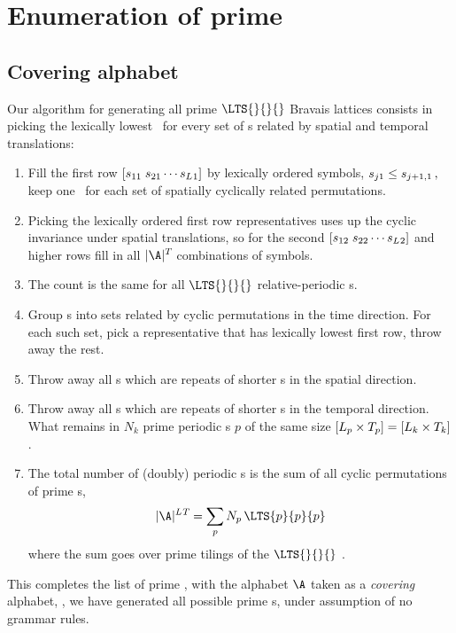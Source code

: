 
\section{Enumeration of prime \twots}
\label{sect:Count2dprimePO}

\begin{description}


\end{description}


\subsection{Covering alphabet}
\label{sect:prime2tCover}

Our algorithm for generating all prime $\LTS{}{}{}$ Bravais
lattices consists in picking the lexically lowest \brick\
for every set of \brick s related by spatial and temporal translations:
\begin{enumerate}
  \item
Fill the first row
\(
\left[{s_{11}}\;{s_{21}}\cdots{\ensuremath{s_{{L_{}}1}}}\right]
\)
by lexically ordered symbols,
\(
{s_{j1}}\leq{\ensuremath{s_{j+1,1}}}\,,
\)
keep one \brick\ for each set of spatially cyclically related
permutations.
  \item
Picking the lexically ordered first row representatives uses up the
cyclic invariance under spatial translations, so for the second
\(
\left[{s_{12}}\;{s_{22}}\cdots{\ensuremath{s_{{L_{}}2}}}\right]
\)
and higher rows fill in all $|\A|^\period{}$ combinations of  symbols.
  \item
The count is the same for all $\LTS{}{}{}$
relative-periodic {\brick}s.
  \item
Group \brick s into sets related by cyclic permutations in the time
direction. For each such set, pick a representative that has lexically
lowest first row, throw away the rest.
  \item
Throw away all {\brick}s which are repeats of
shorter {\brick}s in the spatial direction.
  \item
Throw away all {\brick}s which are repeats of
shorter {\brick}s in the temporal direction. What
remains in $N_k$ prime periodic \brick s $p$ of the same size
$[{L_{p}}\times{\ensuremath{T_{p}}}]=[{L_{k}}\times{\ensuremath{T_{k}}}]$.
  \item
The total number
of (doubly) periodic
\brick s is the sum of all cyclic permutations of prime \brick s,
\[
|\A|^{\speriod{}\period{}}
=
\sum_p N_{p}\,\LTS{p}{p}{p}
\]
where the sum goes over prime tilings of the $\LTS{}{}{}$
\brick.
\end{enumerate}
This completes the list of prime \twots, with the alphabet $\A$ taken
as a {\em covering} alphabet, \ie, we have generated all possible prime
\brick s, under assumption of no grammar rules.

